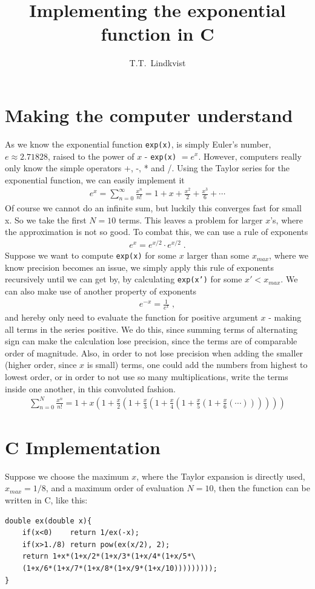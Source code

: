 \documentclass{article}
\title{Implementing the exponential function in C}
\author{T.T.~Lindkvist}
\date{}
\begin{document}
    \maketitle
    \section{Making the computer understand}
    As we know the exponential function \texttt{exp(x)}, is simply Euler's number, $e\approx2.71828$, raised to the power of $x$ - \texttt{exp(x)} $=e^x$. However, computers really only know the simple operators +, -, * and /. Using the Taylor series for the exponential function, we can easily implement it
    \begin{align}
        e^x = \sum_{n=0}^{\infty} \frac{x^n}{n!} = 1 + x + \frac{x^2}{2} + \frac{x^3}{6} + \cdots
    \end{align}
	Of course we cannot do an infinite sum, but luckily this converges fast for small x. So we take the first $N=10$ terms. This leaves a problem for larger $x$'s, where the approximation is not so good. To combat this, we can use a rule of exponents
	\begin{align}
		e^x = e^{x/2}\cdot e^{x/2} \;.
	\end{align}
	Suppose we want to compute \texttt{exp(x)} for some $x$ larger than some $x_{max}$, where we know precision becomes an issue, we simply apply this rule of exponents recursively until we can get by, by calculating \texttt{exp(x')} for some $x'<x_{max}$.
	We can also make use of another property of exponents
	\begin{align}
		e^{-x} = \frac{1}{e^x} \;,
	\end{align}
	and hereby only need to evaluate the function for positive argument $x$ - making all terms in the series positive. We do this, since summing terms of alternating sign can make the calculation lose precision, since the terms are of comparable order of magnitude. Also, in order to not lose precision when adding the smaller (higher order, since $ x $ is small) terms, one could add the numbers from highest to lowest order, or in order to not use so many multiplications, write the terms inside one another, in this convoluted fashion.
	\begin{align*}
		\sum_{n=0}^{N} \frac{x^n}{n!} = 
		1+x\left(1+\frac{x}{2}\left(1+\frac{x}{3}\left(1+\frac{x}{4}\left(1+\frac{x}{5}\left(1+\frac{x}{6}\left(\cdots\right)\right)\right)\right)\right)\right)
	\end{align*}
\section{C Implementation}
Suppose we choose the maximum $ x $, where the Taylor expansion is directly used, $ x_{max} = 1/8 $, and a maximum order of evaluation $ N=10 $, then the function can be written in C, like this:
\lstset{language=Pascal}
\begin{lstlisting}
double ex(double x){
    if(x<0)    return 1/ex(-x);
    if(x>1./8) return pow(ex(x/2), 2);
    return 1+x*(1+x/2*(1+x/3*(1+x/4*(1+x/5*\
    (1+x/6*(1+x/7*(1+x/8*(1+x/9*(1+x/10)))))))));
}
\end{lstlisting}
\end{document}
